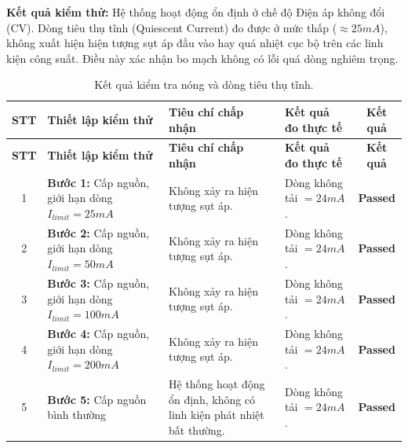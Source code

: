             \textbf{Kết quả kiểm thử:}
            Hệ thống hoạt động ổn định ở chế độ Điện áp không đổi (CV). Dòng tiêu thụ tĩnh (Quiescent Current) đo được ở mức thấp ($\approx 25mA$), không xuất hiện hiện tượng sụt áp đầu vào hay quá nhiệt cục bộ trên các linh kiện công suất. Điều này xác nhận bo mạch không có lỗi quá dòng nghiêm trọng.
            \begin{longtable}{|c|p{}|p{}|p{}|c|}
                \caption{Kết quả kiểm tra nóng và dòng tiêu thụ tĩnh.}
                \label{tab:smoke_test_results_final} \\
                \hline
                \textbf{STT} & \textbf{Thiết lập kiểm thử} & \textbf{Tiêu chí chấp nhận} & \textbf{Kết quả đo thực tế} & \textbf{Kết quả} \\ \hline
                \endfirsthead
                \hline
                \textbf{STT} & \textbf{Thiết lập kiểm thử} & \textbf{Tiêu chí chấp nhận} & \textbf{Kết quả đo thực tế} & \textbf{Kết quả} \\ \hline
                \endhead
                \hline
                \endfoot
                \endlastfoot

                1 & \textbf{Bước 1:} Cấp nguồn, giới hạn dòng $I_{limit} = 25mA$ & Không xảy ra hiện tượng sụt áp. & Dòng không tải $= 24mA$. & \textcolor{modern_blue}{\textbf{Passed}} \\ \hline

                2 & \textbf{Bước 2:} Cấp nguồn, giới hạn dòng $I_{limit} = 50mA$ & Không xảy ra hiện tượng sụt áp. & Dòng không tải $= 24mA$. & \textcolor{modern_blue}{\textbf{Passed}} \\ \hline
                
                3 & \textbf{Bước 3:} Cấp nguồn, giới hạn dòng $I_{limit} = 100mA$ & Không xảy ra hiện tượng sụt áp. & Dòng không tải $= 24mA$. & \textcolor{modern_blue}{\textbf{Passed}} \\ \hline
                
                4 & \textbf{Bước 4:} Cấp nguồn, giới hạn dòng $I_{limit} = 200mA$ & Không xảy ra hiện tượng sụt áp. & Dòng không tải $= 24mA$. & \textcolor{modern_blue}{\textbf{Passed}} \\ \hline
                
                5 & \textbf{Bước 5:} Cấp nguồn bình thường & Hệ thống hoạt động ổn định, không có linh kiện phát nhiệt bất thường. & Dòng không tải $= 24mA$. & \textcolor{modern_blue}{\textbf{Passed}} \\ \hline
            \end{longtable}

